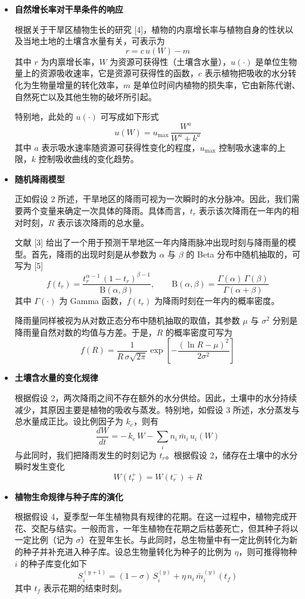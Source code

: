 \documentclass[11pt,a4paper]{ctexart}
\begin{document}
\begin{itemize}
\item \textbf{自然增长率对干旱条件的响应}

根据关于干旱区植物生长的研究 [4]，植物的内禀增长率与植物自身的性状以及当地土地的土壤含水量有关，可表示为
\[
r=c\,u(W)-m
\]
其中 $r$ 为内禀增长率，$W$ 为资源可获得性（土壤含水量），$u(\cdot)$ 是单位生物量上的资源吸收速率，它是资源可获得性的函数，$c$ 表示植物把吸收的水分转化为生物量增量的转化效率，$m$ 是单位时间内植物的损失率，它由新陈代谢、自然死亡以及其他生物的破坏所引起。

特别地，此处的 $u(\cdot)$ 可写成如下形式
\[
u(W)=u_{\max}\,\frac{W^{a}}{W^{a}+k^{a}}
\]
其中 $a$ 表示吸水速率随资源可获得性变化的程度，$u_{\max}$ 控制吸水速率的上限，$k$ 控制吸收曲线的变化趋势。

\item \textbf{随机降雨模型}

正如假设 2 所述，干旱地区的降雨可视为一次瞬时的水分脉冲。因此，我们需要两个变量来确定一次具体的降雨。具体而言，$t_r$ 表示该次降雨在一年内的相对时刻，$R$ 表示该次降雨的总水量。

文献 [3] 给出了一个用于预测干旱地区一年内降雨脉冲出现时刻与降雨量的模型。首先，降雨的出现时刻是从参数为 $\alpha$ 与 $\beta$ 的 Beta 分布中随机抽取的，可写为 [5]
\[
f(t_r)=\frac{t_r^{\alpha-1}\,(1-t_r)^{\beta-1}}{\mathrm{B}(\alpha,\beta)},\qquad
\mathrm{B}(\alpha,\beta)=\frac{\Gamma(\alpha)\,\Gamma(\beta)}{\Gamma(\alpha+\beta)}
\]
其中 $\Gamma(\cdot)$ 为 Gamma 函数，$f(t_r)$ 为降雨时刻在一年内的概率密度。

降雨量同样被视为从对数正态分布中随机抽取的取值，其参数 $\mu$ 与 $\sigma^{2}$ 分别是降雨量自然对数的均值与方差。于是，$R$ 的概率密度可写为
\[
f(R)=\frac{1}{R\,\sigma\sqrt{2\pi}}\exp\left[-\frac{\left(\ln R-\mu\right)^{2}}{2\sigma^{2}}\right]
\]

\item \textbf{土壤含水量的变化规律}

根据假设 2，两次降雨之间不存在额外的水分供给。因此，土壤中的水分持续减少，其原因主要是植物的吸收与蒸发。特别地，如假设 3 所述，水分蒸发与总水量成正比。设比例因子为 $k_e$，则有
\[
\frac{dW}{dt}=-\,k_e\,W-\sum_{i}n_i\,\bar m_i\,u_i(W)
\]
与此同时，我们把降雨发生的时刻记为 $t_r$。根据假设 2，储存在土壤中的水分瞬时发生变化
\[
W\left(t_r^{+}\right)=W\left(t_r^{-}\right)+R
\]

\item \textbf{植物生命规律与种子库的演化}

根据假设 4，夏季型一年生植物具有规律的花期。在这一过程中，植物完成开花、交配与结实。一般而言，一年生植物在花期之后枯萎死亡，但其种子将以一定比例（记为 $\sigma$）在翌年生长。与此同时，总生物量中有一定比例转化为新的种子并补充进入种子库。设总生物量转化为种子的比例为 $\eta$，则可推得物种 $i$ 的种子库变化如下
\[
S_i^{(y+1)}=(1-\sigma)\,S_i^{(y)}+\eta\,n_i\,\bar m_i^{(y)}\left(t_f\right)
\]
其中 $t_f$ 表示花期的结束时刻。
\end{itemize}
\end{document}
